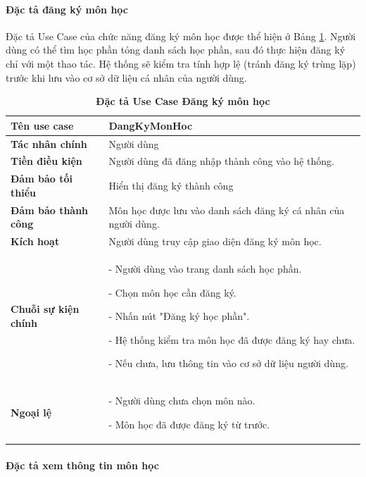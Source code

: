 \documentclass{article}
\begin{document}
	\paragraph{Đặc tả đăng ký môn học} \mbox{}
	
	Đặc tả Use Case của chức năng đăng ký môn học được thể hiện ở Bảng \ref{tab33}. Người dùng có thể tìm học phần tỏng danh sách học phần, sau đó thực hiện đăng ký chỉ với một thao tác. Hệ thống sẽ kiểm tra tính hợp lệ (tránh đăng ký trùng lặp) trước khi lưu vào cơ sở dữ liệu cá nhân của người dùng.
	
	\begin{table}[H]
		\centering
		\caption [Đặc tả Use Case Đăng ký môn học]{\bfseries \fontsize{12pt}{0pt}\selectfont Đặc tả Use Case Đăng ký môn học}
		\label{tab33}
		\begin{tabular}{|p{4cm}|p{10.5cm}|}
			\hline
			\textbf{Tên use case} & DangKyMonHoc \\
			\hline
			\textbf{Tác nhân chính} & Người dùng \\
			\hline
			\textbf{Tiền điều kiện} & Người dùng đã đăng nhập thành công vào hệ thống. \\
			\hline
			\textbf{Đảm bảo tối thiểu} & Hiển thị đăng ký thành công \\
			\hline
			\textbf{Đảm bảo thành công} & Môn học được lưu vào danh sách đăng ký cá nhân của người dùng. \\
			\hline
			\textbf{Kích hoạt} & Người dùng truy cập giao diện đăng ký môn học. \\
			\hline
			\textbf{Chuỗi sự kiện chính} &
			- Người dùng vào trang danh sách học phần.
			
			- Chọn môn học cần đăng ký.
			
			- Nhấn nút "Đăng ký học phần".
			
			- Hệ thống kiểm tra môn học đã được đăng ký hay chưa.
			
			- Nếu chưa, lưu thông tin vào cơ sở dữ liệu người dùng.
			\\
			\hline
			\textbf{Ngoại lệ} &
			- Người dùng chưa chọn môn nào.
			
			- Môn học đã được đăng ký từ trước.
			\\
			\hline
		\end{tabular}
	\end{table}
	
	\paragraph{Đặc tả xem thông tin môn học} \mbox{}
	
\end{document}
